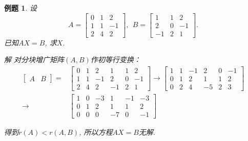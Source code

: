 \documentclass[a4paper]{book}
\newtheorem{eg}{例题}[chapter]
\begin{document}
\begin{eg}
设\begin{displaymath}
A=\begin{bmatrix}0&1&2\\1&1&-1\\2&4&2\end{bmatrix},\ \ B=\begin{bmatrix}1&1&2\\2&0&-1\\-1&2&1\end{bmatrix}.\end{displaymath}
已知$AX=B$, 求$X$.

解 对分块增广矩阵$(A,B)$作初等行变换：
\begin{displaymath}\begin{aligned}
\begin{bmatrix}A&B\end{bmatrix}=&\begin{bmatrix}0&1&2&1&1&2\\1&1&-1&2&0&-1\\2&4&2&-1&2&1\end{bmatrix}\rightarrow
\begin{bmatrix}1&1&-1&2&0&-1\\0&1&2&1&1&2\\0&2&4&-5&2&3\end{bmatrix}\\ \rightarrow &\begin{bmatrix}1&0&-3&1&-1&-3\\0&1&2&1&1&2\\0&0&0&-7&0&-1\end{bmatrix}
\end{aligned}\end{displaymath}

得到$r(A)<r(A,B)$, 所以方程$AX=B$无解.
\end{eg}
\end{document}
